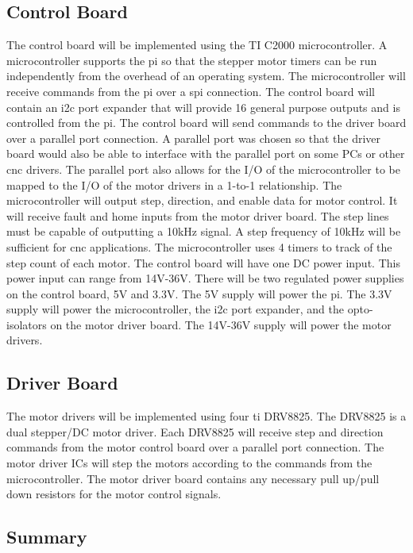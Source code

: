 \subsection{Control Board}
The control board will be implemented using the TI C2000 microcontroller.
A microcontroller supports the \gls{pi} so that the stepper motor timers can be run independently from the overhead of an operating system.
The microcontroller will receive commands from the \gls{pi} over a \gls{spi} connection.
The control board will contain an \gls{i2c} port expander that will provide 16 general purpose outputs and is controlled from the \gls{pi}.
The control board will send commands to the driver board over a parallel port connection.
A parallel port was chosen so that the driver board would also be able to interface with the parallel port on some PCs or other \gls{cnc} drivers.
The parallel port also allows for the I/O of the microcontroller to be mapped to the I/O of the motor drivers in a 1-to-1 relationship.
The microcontroller will output step, direction, and enable data for motor control.
It will receive fault and home inputs from the motor driver board.
The step lines must be capable of outputting a 10kHz signal.
A step frequency of 10kHz will be sufficient for \gls{cnc} applications.
The microcontroller uses 4 timers to track of the step count of each motor. 
The control board will have one DC power input.
This power input can range from 14V-36V.
There will be two regulated power supplies on the control board, 5V and 3.3V.
The 5V supply will power the \gls{pi}.
The 3.3V supply will power the microcontroller, the \gls{i2c} port expander, and the opto-isolators on the motor driver board.
The 14V-36V supply will power the motor drivers.

\subsection{Driver Board}
The motor drivers will be implemented using four \gls{ti} DRV8825.
The DRV8825 is a dual stepper/DC motor driver.
Each DRV8825 will receive step and direction commands from the motor control board over a parallel port connection.
The motor driver ICs will step the motors according to the commands from the microcontroller.
The motor driver board contains any necessary pull up/pull down resistors for the motor control signals.



\subsection{Summary}